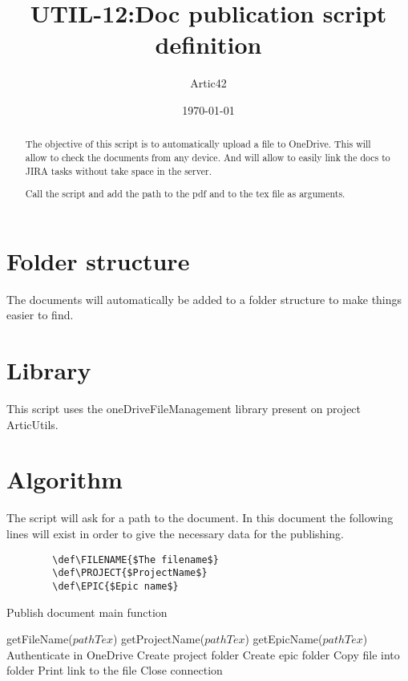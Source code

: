 \def\MYTITLE{UTIL-12:Doc publication script definition}
\def\MYNAME{Artic42}



\usepackage{dirtree}


    \title{\MYTITLE}
    \author{\MYNAME}
    \date{\today}
    \maketitle
    \thispagestyle{firstPage}

    \begin{abstract}
        The objective of this script is to automatically upload a file to OneDrive. This will allow to check the documents from any device. And will allow to easily link the docs to JIRA tasks without take space in the server.

        Call the script and add the path to the pdf and to the tex file as arguments.
    \end{abstract}

    \section{Folder structure}
    The documents will automatically be added to a folder structure to make things easier to find.
    \vspace{12pt}
    \renewcommand{\baselinestretch}{1.3}
    \renewcommand{\baselinestretch}{1}
    \section{Library}
    This script uses the oneDriveFileManagement library present on project ArticUtils.
    \section{Algorithm}
    The script will ask for a path to the document. In this document the following lines will exist in order to give the necessary data for the publishing.
    \begin{verbatim}
        \def\FILENAME{$The filename$}
        \def\PROJECT{$ProjectName$}
        \def\EPIC{$Epic name$}
    \end{verbatim}
    \begin{algorithm}[h!]
        \caption{Publish document main function}
    \begin{algorithmic}
        \State getFileName($pathTex$)
        \State getProjectName($pathTex$)
        \State getEpicName($pathTex$)
        \State Authenticate in OneDrive
            \State Create project folder
        \EndIf
            \State Create epic folder
        \EndIf
        \State Copy file into folder
        \State Print link to the file
        \State Close connection
        \EndFunction
    \end{algorithmic}
    \end{algorithm}

